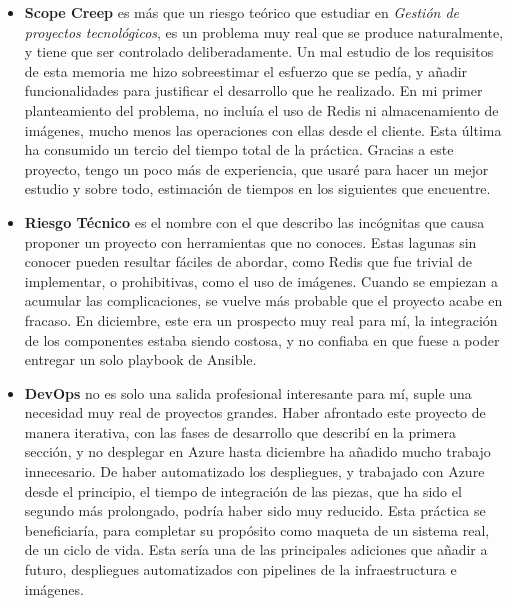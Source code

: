 \documentclass[11pt]{article}
\begin{document}
\begin{flushleft}
    \begin{itemize}
			\itemsep0em 
			\item \textbf{Scope Creep} es más que un riesgo teórico que estudiar en \textit{Gestión de proyectos tecnológicos}, es un problema muy real que se produce naturalmente, y tiene que ser controlado deliberadamente. Un mal estudio de los requisitos de esta memoria me hizo sobreestimar el esfuerzo que se pedía, y añadir funcionalidades para justificar el desarrollo que he realizado. En mi primer planteamiento del problema, no incluía el uso de Redis ni almacenamiento de imágenes, mucho menos las operaciones con ellas desde el cliente. Esta última ha consumido un tercio del tiempo total de la práctica. Gracias a este proyecto, tengo un poco más de experiencia, que usaré para hacer un mejor estudio y sobre todo, estimación de tiempos en los siguientes que encuentre.
            \linebreak
   
            \item \textbf{Riesgo Técnico} es el nombre con el que describo las incógnitas que causa proponer un proyecto con herramientas que no conoces. Estas lagunas sin conocer pueden resultar fáciles de abordar, como Redis que fue trivial de implementar, o prohibitivas, como el uso de imágenes. Cuando se empiezan a acumular las complicaciones, se vuelve más probable que el proyecto acabe en fracaso. En diciembre, este era un prospecto muy real para mí, la integración de los componentes estaba siendo costosa, y no confiaba en que fuese a poder entregar un solo playbook de Ansible.
            \linebreak
            
            \item \textbf{DevOps} no es solo una salida profesional interesante para mí, suple una necesidad muy real de proyectos grandes. Haber afrontado este proyecto de manera iterativa, con las fases de desarrollo que describí en la primera sección, y no desplegar en Azure hasta diciembre ha añadido mucho trabajo innecesario. De haber automatizado los despliegues, y trabajado con Azure desde el principio, el tiempo de integración de las piezas, que ha sido el segundo más prolongado, podría haber sido muy reducido. Esta práctica se beneficiaría, para completar su propósito como maqueta de un sistema real, de un ciclo de vida. Esta sería una de las principales adiciones que añadir a futuro, despliegues automatizados con pipelines de la infraestructura e imágenes.
            \linebreak        
            

\end{itemize}
\end{flushleft}
\end{document}
